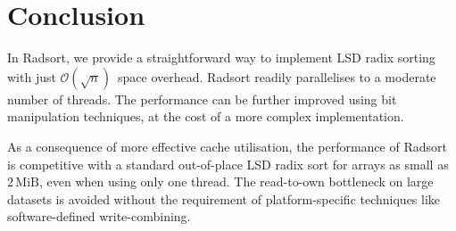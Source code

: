 \documentclass[nolineno,a4paper,UKenglish,cleveref, autoref, thm-restate]{socg-lipics-v2021}
\begin{document}
\section{Conclusion}
In Radsort, we provide a straightforward way to implement LSD radix sorting with
just $\mathcal O(\sqrt n)$~space overhead.  Radsort readily parallelises to a moderate
number of threads.
The performance can be further improved using bit manipulation techniques,
at the cost of a more complex implementation.

As a consequence of more effective cache utilisation,
the performance of Radsort is competitive with a standard out-of-place LSD radix
sort for arrays as small as~$2\,\mathrm{MiB}$, even when using only one thread.
The read-to-own bottleneck on large datasets is avoided without the requirement of
platform-specific techniques like software-defined write-combining.


\end{document}
